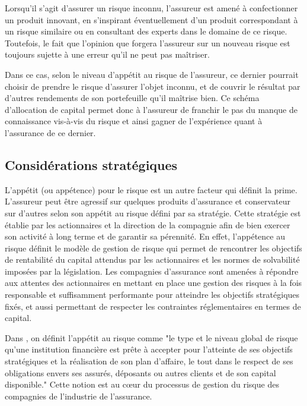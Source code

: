 \documentclass[11pt]{article}
\begin{document}
Lorsqu'il s'agit d'assurer un risque inconnu, l'assureur est amené à confectionner un produit innovant, en s'inspirant éventuellement d'un produit correspondant à un risque similaire ou en consultant des experts dans le domaine de ce risque. Toutefois, le fait que l'opinion que forgera l'assureur sur un nouveau risque est toujours sujette à une erreur qu'il ne peut pas maîtriser.

Dans ce cas, selon le niveau d'appétit au risque de l'assureur, ce dernier pourrait choisir de prendre le risque d'assurer l'objet inconnu, et de couvrir le résultat par d'autres rendements de son portefeuille qu'il maîtrise bien. Ce schéma d'allocation de capital permet donc à l'assureur de franchir le pas du manque de connaissance vis-à-vis du risque et ainsi gagner de l'expérience quant à l'assurance de ce dernier. 

\subsection{Considérations stratégiques}

L'appétit (ou appétence) pour le risque est un autre facteur qui définit la prime. L'assureur peut être agressif sur quelques produits d'assurance et conservateur sur d'autres selon son appétit au risque défini par sa stratégie. Cette stratégie est établie par les actionnaires et la direction de la compagnie afin de bien exercer son activité à long terme et de garantir sa pérennité. En effet, l'appétence au risque définit le modèle de gestion de risque qui permet de rencontrer les objectifs de rentabilité du capital attendus par les actionnaires et les normes de solvabilité imposées par la législation. Les compagnies d'assurance sont amenées à répondre aux attentes des actionnaires en mettant en place une gestion des risques à la fois responsable et suffisamment performante pour atteindre les objectifs stratégiques fixés, et aussi permettant de respecter les contraintes réglementaires en termes de capital.

Dans \cite{AutoriteMarchesFinanciers}, on définit l'appétit au risque comme "le type et le niveau global de risque
qu'une institution financière est prête à accepter pour l'atteinte de ses objectifs
stratégiques et la réalisation de son plan d'affaire, le tout dans le respect de ses
obligations envers ses assurés, déposants ou autres clients et de son capital disponible." Cette notion est au cœur du processus de gestion du risque des compagnies de l'industrie de l'assurance.
\end{document}
